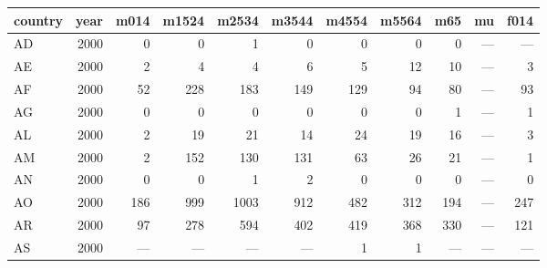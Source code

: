 \begin{tabular}{lrrrrrrrrrr}
  \toprule
 country & year & m014 & m1524 & m2534 & m3544 & m4554 & m5564 & m65 & mu & f014 \\ 
  \midrule
  AD & 2000 &   0 &   0 &   1 &   0 &   0 &   0 &   0 & --- & --- \\ 
  AE & 2000 &   2 &   4 &   4 &   6 &   5 &  12 &  10 & --- &   3 \\ 
  AF & 2000 &  52 & 228 & 183 & 149 & 129 &  94 &  80 & --- &  93 \\ 
  AG & 2000 &   0 &   0 &   0 &   0 &   0 &   0 &   1 & --- &   1 \\ 
  AL & 2000 &   2 &  19 &  21 &  14 &  24 &  19 &  16 & --- &   3 \\ 
  AM & 2000 &   2 & 152 & 130 & 131 &  63 &  26 &  21 & --- &   1 \\ 
  AN & 2000 &   0 &   0 &   1 &   2 &   0 &   0 &   0 & --- &   0 \\ 
  AO & 2000 & 186 & 999 & 1003 & 912 & 482 & 312 & 194 & --- & 247 \\ 
  AR & 2000 &  97 & 278 & 594 & 402 & 419 & 368 & 330 & --- & 121 \\ 
  AS & 2000 & --- & --- & --- & --- &   1 &   1 & --- & --- & --- \\ 
   \bottomrule
\end{tabular}
